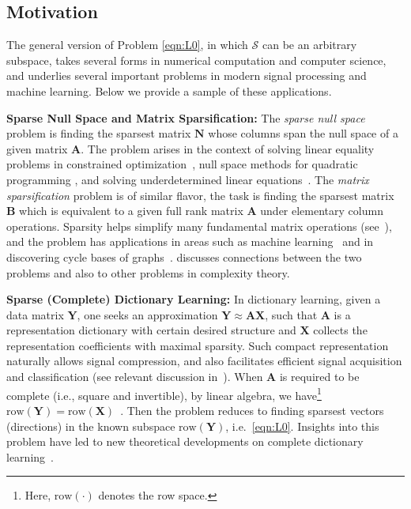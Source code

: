 \documentclass[11pt, journal, final]{IEEEtran}
\numberwithin{equation}{section}
\newcommand{\mb}{\mathbf}
\begin{document}
{\subsection{Motivation}
The general version of Problem \eqref{eqn:L0}, in which $\mathcal{S}$ can be an arbitrary subspace, takes several forms in numerical computation and computer science, and underlies several important problems in modern signal processing and machine learning. Below we provide a sample of these applications.
\par\smallskip
\noindent\textbf{Sparse Null Space and Matrix Sparsification:} The \emph{sparse null space} problem is finding the sparsest matrix $\mb N$ whose columns span the null space of a given matrix $\mb A$. The problem arises in the context of solving linear equality problems in constrained optimization~\cite{coleman1986null}, null space methods for quadratic programming \cite{berry85algorithm}, and solving underdetermined linear equations~\cite{gilbert86computing}. The \emph{matrix sparsification} problem is of similar flavor, the task is finding the sparsest matrix $\mb B$ which is equivalent to a given full rank matrix $\mb A$ under elementary column operations. Sparsity helps simplify many fundamental matrix operations (see~\cite{duff86direct}), and the problem has applications in areas such as machine learning~\cite{Smola00sparsegreedy} and in discovering cycle bases of graphs~\cite{Kavitha04afaster}. \cite{gottlieb2010matrix} discusses connections between the two problems and also to other problems in complexity theory.
\par\smallskip
\noindent\textbf{Sparse (Complete) Dictionary Learning:} In dictionary learning, given a data matrix $\mb Y$, one seeks an approximation $\mb Y \approx \mb A \mb X$, such that $\mb A$ is a representation dictionary with certain desired structure and $\mb X$ collects the representation coefficients with maximal sparsity. Such compact representation naturally allows signal compression, and also facilitates efficient signal acquisition and classification (see relevant discussion in~\cite{mairal2014sparse}). When $\mb A$ is required to be complete (i.e., square and invertible), by linear algebra, we have\footnote{Here, $\mathrm{row}(\cdot)$ denotes the row space.} $\mathrm{row}(\mb Y) = \mathrm{row}(\mb X)$~\cite{spielman2013exact}. Then the problem reduces to finding sparsest vectors (directions) in the known subspace $\mathrm{row}(\mb Y)$, i.e.~\eqref{eqn:L0}. Insights into this problem have led to new theoretical developments on complete dictionary learning~\cite{spielman2013exact, hand2013recovering, sun2015complete}.
}
\end{document}
